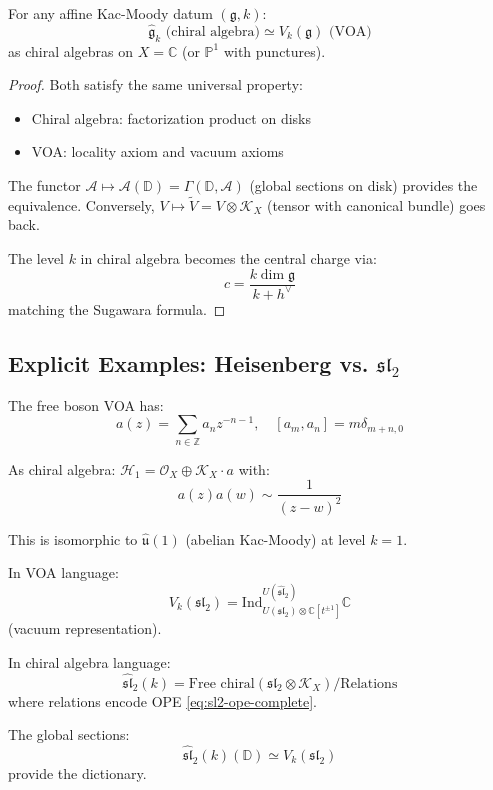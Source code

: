 \begin{proposition}
For any affine Kac-Moody datum $(\mathfrak{g}, k)$:
$$\widehat{\mathfrak{g}}_k \text{ (chiral algebra)} \simeq V_k(\mathfrak{g}) \text{ (VOA)}$$
as chiral algebras on $X = \mathbb{C}$ (or $\mathbb{P}^1$ with punctures).
\end{proposition}

\begin{proof}
Both satisfy the same universal property:
\begin{itemize}
\item Chiral algebra: factorization product on disks
\item VOA: locality axiom and vacuum axioms
\end{itemize}
The functor $\mathcal{A} \mapsto \mathcal{A}(\mathbb{D}) = \Gamma(\mathbb{D}, \mathcal{A})$ (global sections on disk) provides the equivalence. Conversely, $V \mapsto \widetilde{V} = V \otimes \mathcal{K}_X$ (tensor with canonical bundle) goes back.

The level $k$ in chiral algebra becomes the central charge via:
$$c = \frac{k \dim \mathfrak{g}}{k + h^\vee}$$
matching the Sugawara formula.
\end{proof}

\subsection{Explicit Examples: Heisenberg vs. $\mathfrak{sl}_2$}

\begin{example}
The free boson VOA has:
$$a(z) = \sum_{n \in \mathbb{Z}} a_n z^{-n-1}, \quad [a_m, a_n] = m \delta_{m+n,0}$$

As chiral algebra: $\mathcal{H}_1 = \mathcal{O}_X \oplus \mathcal{K}_X \cdot a$ with:
$$a(z)a(w) \sim \frac{1}{(z-w)^2}$$

This is isomorphic to $\widehat{\mathfrak{u}}(1)$ (abelian Kac-Moody) at level $k=1$.
\end{example}

\begin{example}
In VOA language:
$$V_k(\mathfrak{sl}_2) = \text{Ind}_{U(\mathfrak{sl}_2) \otimes \mathbb{C}[t^{\pm 1}]}^{U(\widehat{\mathfrak{sl}}_2)} \mathbb{C}$$
(vacuum representation).

In chiral algebra language:
$$\widehat{\mathfrak{sl}}_2(k) = \text{Free chiral}(\mathfrak{sl}_2 \otimes \mathcal{K}_X) / \text{Relations}$$
where relations encode OPE \eqref{eq:sl2-ope-complete}.

The global sections:
$$\widehat{\mathfrak{sl}}_2(k)(\mathbb{D}) \simeq V_k(\mathfrak{sl}_2)$$
provide the dictionary.
\end{example}

